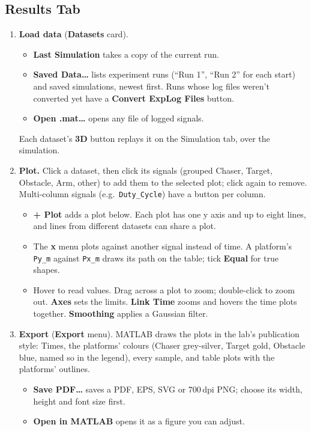 \documentclass[11pt,a4paper]{article}
\newcommand{\ui}[1]{\textsf{\textbf{#1}}}
\newcommand{\fn}[1]{\texttt{#1}}
\begin{document}
\subsection{Results Tab}
\begin{enumerate}
  \item \textbf{Load data} (\ui{Datasets} card).
        \begin{itemize}
          \item \ui{Last Simulation} takes a copy of the current run.
          \item \ui{Saved Data\ldots} lists experiment runs (``Run 1'', ``Run 2'' for each start) and saved simulations,
                newest first. Runs whose log files weren't converted yet have a \ui{Convert ExpLog Files} button.
          \item \ui{Open .mat\ldots} opens any file of logged signals.
        \end{itemize}
        Each dataset's \ui{3D} button replays it on the Simulation tab, over the simulation.
  \item \textbf{Plot.} Click a dataset, then click its signals (grouped Chaser, Target, Obstacle, Arm, other) to add them to the
        selected plot; click again to remove. Multi-column signals (e.g.\ \fn{Duty\_Cycle}) have a button per column.
        \begin{itemize}
          \item \ui{+ Plot} adds a plot below. Each plot has one y axis and up to eight lines, and lines from
                different datasets can share a plot.
          \item The \ui{x} menu plots against another signal instead of time. A platform's \fn{Py\_m} against \fn{Px\_m}
                draws its path on the table; tick \ui{Equal} for true shapes.
          \item Hover to read values. Drag across a plot to zoom; double-click to zoom out. \ui{Axes} sets the limits.
                \ui{Link Time} zooms and hovers the time plots together. \ui{Smoothing} applies a Gaussian filter.
        \end{itemize}
  \item \textbf{Export} (\ui{Export} menu). MATLAB draws the plots in the lab's publication style: Times, the
        platforms' colours (Chaser grey-silver, Target gold, Obstacle blue, named so in the legend), every sample, and table plots with the platforms' outlines.
        \begin{itemize}
          \item \ui{Save PDF\ldots} saves a PDF, EPS, SVG or 700\,dpi PNG; choose its width, height and font size first.
          \item \ui{Open in MATLAB} opens it as a figure you can adjust.
        \end{itemize}
\end{enumerate}
\end{document}
